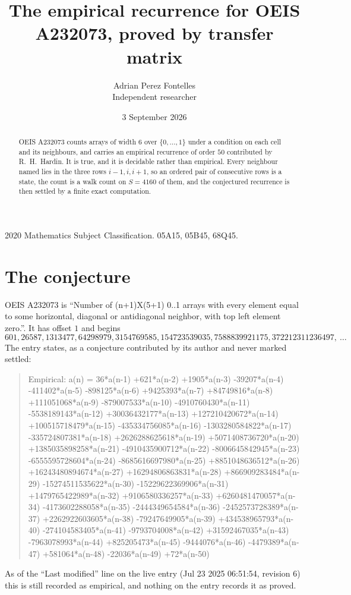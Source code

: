 \documentclass[11pt,a4paper]{article}
\title{The empirical recurrence for OEIS A232073, proved by transfer matrix}
\author{Adrian Perez Fontelles\\ \small Independent researcher}
\date{3 September 2026}
\theoremstyle{plain}
\theoremstyle{definition}
\begin{document}
\maketitle

\begin{abstract}
OEIS A232073 counts arrays of width $6$ over $\{0,\dots,1\}$ under a condition on each cell
and its neighbours, and carries an empirical recurrence of order $50$ contributed by
R.~H.~Hardin. It is true, and it is decidable rather than empirical. Every neighbour named lies
in the three rows $i-1,i,i+1$, so an ordered pair of consecutive rows is a state, the count is
a walk count on $S=4160$ of them, and the conjectured recurrence is then settled by a finite
exact computation.
\end{abstract}

\noindent\small 2020 Mathematics Subject Classification. 05A15, 05B45, 68Q45.\normalsize

\section{The conjecture}

OEIS A232073 is ``Number of (n+1)X(5+1) 0..1 arrays with every element equal to some horizontal, diagonal or antidiagonal neighbor, with top left element zero.''. It has offset $1$ and begins
\[
601, 26587, 1313477, 64298979, 3154769585, 154723539035, 7588839921175, 372212311236497,\ \dots
\]
The entry states, as a conjecture contributed by its author and never marked settled:
\begin{quote}
Empirical: a(n) = 36*a(n-1) +621*a(n-2) +1905*a(n-3) -39207*a(n-4) -411402*a(n-5) -898125*a(n-6) +9425393*a(n-7) +84749816*a(n-8) +111051068*a(n-9) -879007533*a(n-10) -4910760430*a(n-11) -5538189143*a(n-12) +30036432177*a(n-13) +127210420672*a(n-14) +100515718479*a(n-15) -435334756085*a(n-16) -1303280584822*a(n-17) -335724807381*a(n-18) +2626288625618*a(n-19) +5071408736720*a(n-20) +1385035898258*a(n-21) -4910435900712*a(n-22) -8006645842945*a(n-23) -6555595728604*a(n-24) -8685616697980*a(n-25) +8851048636512*a(n-26) +16243480894674*a(n-27) +16294806863831*a(n-28) +866909283484*a(n-29) -15274511535622*a(n-30) -15229622369906*a(n-31) +1479765422989*a(n-32) +9106580336257*a(n-33) +6260481470057*a(n-34) -4173602288058*a(n-35) -2444349654584*a(n-36) -2452573728389*a(n-37) +2262922603605*a(n-38) -79247649905*a(n-39) +434538965793*a(n-40) -274104583405*a(n-41) -9793704008*a(n-42) +31592467035*a(n-43) -7963078993*a(n-44) +825205473*a(n-45) -9444076*a(n-46) -4479389*a(n-47) +581064*a(n-48) -22036*a(n-49) +72*a(n-50)
\end{quote}
As of the ``Last modified'' line on the live entry (Jul 23 2025 06:51:54, revision 6) this is still
recorded as empirical, and nothing on the entry records it as proved.
\end{document}
